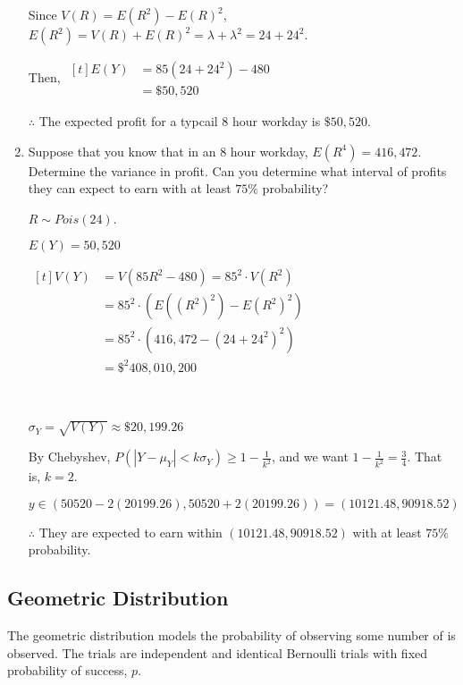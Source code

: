 \begin{example}
\begin{enumerate}[label=\alph*)]
        Since $V(R) = E(R^2) - E(R)^2$, $E(R^2) = V(R) + E(R)^2 = \lambda + \lambda^2 = 24 + 24^2$. 

        Then, $\begin{aligned}[t]
            E(Y) & = 85 (24 + 24^2) - 480 \\
                 & = \$50,520
        \end{aligned}$

        $\therefore$ The expected profit for a typcail $8$ hour workday is $\$50,520$. 

        \item Suppose that you know that in an 8 hour workday, $E(R^4) = 416,472$. Determine the variance in profit. Can you determine what interval of profits they can expect to earn with at least $75\%$ probability?

        $R \sim Pois(24)$. 

        $E(Y) = 50,520$

        $\begin{aligned}[t]
            V(Y) & = V(85R^2 - 480) = 85^2 \cdot V(R^2)  \\
                 & = 85^2 \cdot (E((R^2)^2) - E(R^2)^2)  \\
                 & = 85^2 \cdot (416,472 - (24 + 24^2)^2) \\
                 & = \$^2 408,010,200
        \end{aligned}$

        {~~~}

        $\sigma_Y = \sqrt{V(Y)} \approx \$20,199.26$

        By Chebyshev, $P(|Y - \mu_Y| < k\sigma_Y) \ge 1 - \frac{1}{k^2}$, and we want $1 - \frac{1}{k^2} = \frac{3}{4}$. That is, $k = 2$. 

        $y \in (50520 - 2(20199.26), 50520 + 2(20199.26)) = (10121.48, 90918.52)$

        $\therefore$ They are expected to earn within $(10121.48, 90918.52)$ with at least $75\%$ probability. 
    \end{enumerate}
\end{example}

\subsection{Geometric Distribution}

The geometric distribution models the probability of observing some number of  is observed. The trials are
independent and identical Bernoulli trials with fixed probability of success, $p$.

